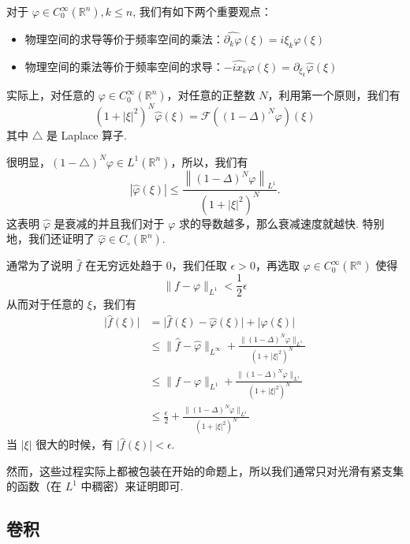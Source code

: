 对于 $\varphi\in C_{0}^{\infty}(\mathbb{R}^{n}),k\leq n$, 我们有如下两个重要观点：

\begin{itemize}
	\item 物理空间的求导等价于频率空间的乘法：$\widehat{\partial_k \varphi}(\xi)=i \xi_k \widehat{\varphi}(\xi)$
	\item 物理空间的乘法等价于频率空间的求导：$\widehat{-i x_k \varphi}(\xi)=\partial_{\xi_k} \widehat{\varphi}(\xi)$
\end{itemize}

实际上，对任意的 $\varphi \in C_0^{\infty}\left(\mathbb{R}^n\right)$，对任意的正整数 $N$，利用第一个原则，我们有
\[
\left(1+|\xi|^2\right)^N \widehat{\varphi}(\xi)=\mathcal{F}\left((1-\Delta)^N \varphi\right)(\xi)
\]
其中 $\triangle$ 是 Laplace 算子.

很明显，$(1-\triangle)^N \varphi \in L^1\left(\mathbb{R}^n\right)$，所以，我们有
\[
|\widehat{\varphi}(\xi)| \leqslant \frac{\left\|(1-\Delta)^N \varphi\right\|_{L^1}}{\left(1+|\xi|^2\right)^N} .
\]
这表明 $\widehat{\varphi}$ 是衰减的并且我们对于 $\varphi$ 求的导数越多，那么衰减速度就越快. 特别地，我们还证明了 $\widehat{\varphi} \in C_{\circ}\left(\mathbb{R}^n\right)$.

通常为了说明 $\widehat{f}$ 在无穷远处趋于 0，我们任取 $\epsilon>0$，再选取 $\varphi\in C_0^{\infty}(\mathbb{R}^{n})$ 使得
\[
\lVert f-\varphi \rVert _{L^{1}}<\frac{1}{2}\epsilon
\]
从而对于任意的 $\xi$，我们有
\[
\begin{aligned}
\lvert \widehat{f}(\xi) \rvert  & =\lvert \widehat{f}(\xi)-\widehat{\varphi}(\xi) \rvert +\lvert \widehat{\varphi}(\xi) \rvert  \\
 & \leq \lVert \widehat{f}-\widehat{\varphi} \rVert _{L^{\infty}}+\frac{\lVert (1-\Delta)^{N}\varphi \rVert _{L^{1}}}{(1+\lvert \xi \rvert ^2)^{N}} \\
 & \leq \lVert f-\varphi \rVert _{L^{1}}+\frac{\lVert (1-\Delta)^{N}\varphi \rVert _{L^{1}}}{(1+\lvert \xi \rvert ^2)^{N}} \\
 & \leq \frac{\epsilon}{2}+\frac{\lVert (1-\Delta)^{N}\varphi \rVert _{L^{1}}}{(1+\lvert \xi \rvert ^2)^{N}}
\end{aligned}
\]
当 $\lvert \xi \rvert$ 很大的时候，有 $\lvert \widehat{f}(\xi) \rvert<\epsilon$.

然⽽，这些过程实际上都被包装在开始的命题上，所以我们通常只对光滑有紧支集的函数（在 $L^{1}$ 中稠密）来证明即可.

\subsection{卷积}

